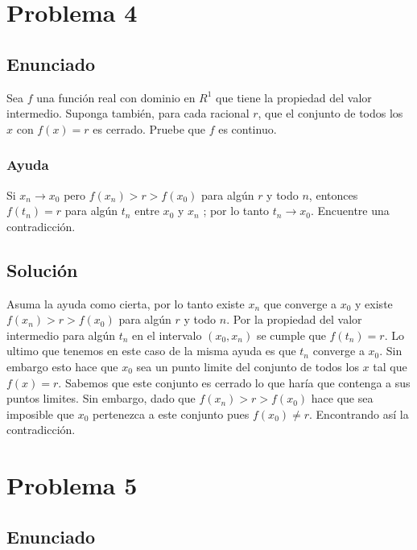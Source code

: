 \documentclass{report}
\begin{document}
\chapter{Problema 4}
\section{Enunciado}


Sea $f$ una función real con dominio en $R^{1}$ que tiene la propiedad del valor intermedio. Suponga también, para cada racional $r$, que el conjunto de todos los $x$ con $f(x)=r$ es cerrado. Pruebe que $f$ es continuo.

\subsection{Ayuda}
Si $x_n \to x_0$ pero $f\left( x_n \right) > r > f\left( x_0 \right) $ para algún $r$ y todo $n$, entonces  $f\left( t_n \right) = r$ para algún $t_n$ entre $x_0$ y $x_n$ ; por lo tanto $t_n \to  x_0$. Encuentre una contradicción.

\section{Solución}

Asuma la ayuda como cierta, por lo tanto existe $x_n$ que converge a $x_0$ y existe $f\left( x_n \right) > r > f\left( x_0 \right) $ para algún $r$ y todo $n$. Por la propiedad del valor intermedio para algún $t_n$ en el intervalo $\left( x_0, x_n \right) $ se cumple que $f\left( t_n \right) = r$. Lo ultimo que tenemos en este caso de la misma ayuda es que $t_n$ converge a $x_0$. Sin embargo esto hace que $x_0$ sea un punto limite del conjunto de todos los $x$ tal que  $f\left( x \right) = r$. Sabemos que este conjunto es cerrado lo que haría que contenga a sus puntos limites. Sin embargo, dado que $f\left( x_n \right) > r > f\left( x_0 \right) $ hace que sea imposible que $x_0$ pertenezca a este conjunto pues $f\left( x_0 \right) \neq r$. Encontrando así la contradicción.

\chapter{Problema 5}
\section{Enunciado}
\end{document}
